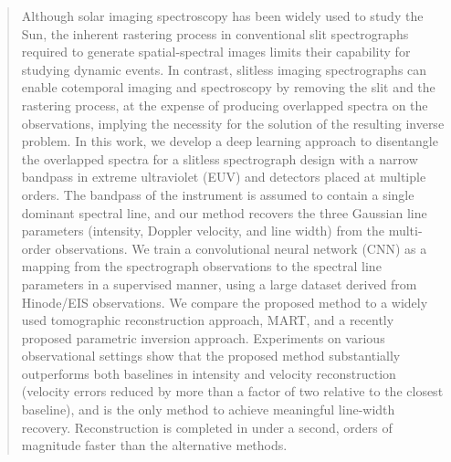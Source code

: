 \documentclass[linenumbers,twocolumn]{aastex7}
\begin{document}
\begin{abstract}
\noindent
Although solar imaging spectroscopy has been widely used to study the Sun, the
inherent rastering process in conventional slit spectrographs required to generate 
spatial-spectral images limits their capability for studying dynamic events. In 
contrast, slitless imaging spectrographs can enable cotemporal imaging
and spectroscopy by removing the slit and the rastering process, at the expense 
of producing overlapped spectra on the observations, implying the necessity for
the solution of the resulting inverse problem. In this work, we develop a deep
learning approach to disentangle the overlapped spectra for a slitless
spectrograph design with a narrow bandpass in extreme ultraviolet (EUV) and
detectors placed at multiple orders. The bandpass of the instrument is assumed
to contain a single dominant spectral line, and our method recovers the three
Gaussian line parameters (intensity, Doppler velocity, and line width) from the
multi-order observations. We train a convolutional neural network (CNN) as a
mapping from the spectrograph observations to the spectral line parameters in a
supervised manner, using a large dataset derived from Hinode/EIS observations.
We compare the proposed method to a widely used tomographic reconstruction
approach, MART, and a recently proposed parametric inversion approach. Experiments on various observational settings show that the proposed
method substantially outperforms both baselines in intensity and velocity
reconstruction (velocity errors reduced by more than a factor of two relative to
the closest baseline), and is the only method to achieve
meaningful line-width recovery. Reconstruction is completed in under a second,
orders of magnitude faster than the alternative methods.

\end{abstract}

\end{document}
